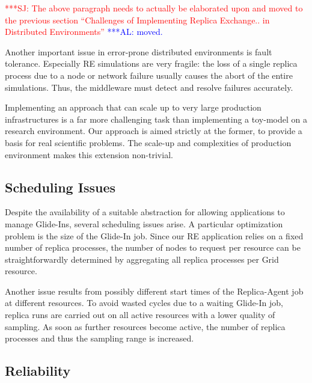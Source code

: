 \documentclass{rspublic}
\newcommand{\alnote}[1]{ {\textcolor{blue} { ***AL: #1 }}}
\newcommand{\jhanote}[1]{ {\textcolor{red} { ***SJ: #1 }}}
\newcommand{\alnote}[1]{}
\newcommand{\jhanote}[1]{}
\newcommand{\glidein}[1]{Glide-In }
\newcommand{\replicaagent}[1]{Replica-Agent }
\begin{document}
\jhanote{The above paragraph needs to actually be elaborated upon and
  moved to the previous section ``Challenges of Implementing Replica
  Exchange.. in Distributed Environments''}
\alnote{moved.}

                 
Another important issue in error-prone distributed environments is
fault tolerance.  Especially RE simulations are very fragile: the
loss of a single replica process due to a node or network failure
usually causes the abort of the entire simulations. Thus, the
middleware must detect and resolve failures accurately.
                                  
Implementing an approach that can scale up to very large 
production infrastructures is a far more challenging task than
implementing a toy-model on a research environment. Our approach is
aimed strictly at the former, to provide a basis for real scientific
problems. The scale-up and complexities of production environment makes
this extension non-trivial.



\subsection{Scheduling Issues}

Despite the availability of a suitable abstraction for allowing
applications to manage Glide-Ins, several scheduling issues arise. A
particular optimization problem is the size of the \glidein\
job. Since our RE application relies on a fixed number of replica
processes, the number of nodes to request per resource can be
straightforwardly determined by aggregating all replica processes per
Grid resource.

Another issue results from possibly different start times of the
\replicaagent\ job at different resources.  To avoid wasted cycles due
to a waiting \glidein\ job, replica runs are carried out on all active
resources with a lower quality of sampling. As soon as further
resources become active, the number of replica processes and thus the
sampling range is increased.

\subsection{Reliability}
   
\end{document}
